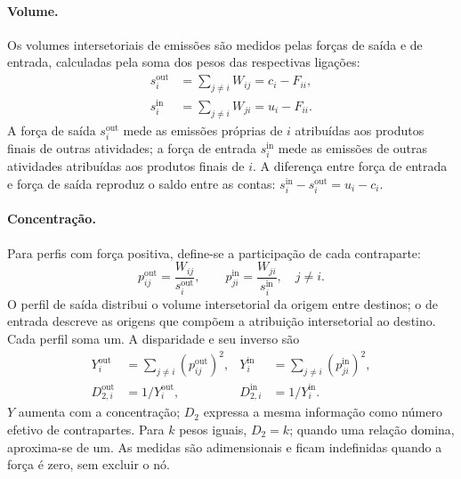 \paragraph{Volume.}
Os volumes intersetoriais de emissões são medidos pelas forças de saída e de entrada, calculadas pela soma dos pesos das respectivas ligações:
\begin{equation}
\begin{aligned}
s_i^{\mathrm{out}}&=\sum_{j\ne i}W_{ij}=c_i-F_{ii},\\
s_i^{\mathrm{in}}&=\sum_{j\ne i}W_{ji}=u_i-F_{ii}.
\end{aligned}
\label{eq:forcas-externas}
\end{equation}
A força de saída $s_i^{\mathrm{out}}$ mede as emissões próprias de $i$ atribuídas aos produtos finais de outras atividades; a força de entrada $s_i^{\mathrm{in}}$ mede as emissões de outras atividades atribuídas aos produtos finais de $i$. A diferença entre força de entrada e força de saída reproduz o saldo entre as contas: $s_i^{\mathrm{in}}-s_i^{\mathrm{out}}=u_i-c_i$.

\paragraph{Concentração.}
Para perfis com força positiva, define-se a participação de cada contraparte:
\begin{equation}
p_{ij}^{\mathrm{out}}=\frac{W_{ij}}{s_i^{\mathrm{out}}},\qquad
p_{ji}^{\mathrm{in}}=\frac{W_{ji}}{s_i^{\mathrm{in}}},\quad j\ne i.
\label{eq:participacoes-externas}
\end{equation}
O perfil de saída distribui o volume intersetorial da origem entre destinos; o de entrada descreve as origens que compõem a atribuição intersetorial ao destino. Cada perfil soma um. A disparidade e seu inverso são
\begin{equation}
\begin{aligned}
Y_i^{\mathrm{out}}&=\sum_{j\ne i}(p_{ij}^{\mathrm{out}})^2,&
Y_i^{\mathrm{in}}&=\sum_{j\ne i}(p_{ji}^{\mathrm{in}})^2,\\
D_{2,i}^{\mathrm{out}}&=1/Y_i^{\mathrm{out}},&
D_{2,i}^{\mathrm{in}}&=1/Y_i^{\mathrm{in}}.
\end{aligned}
\label{eq:disparidade}
\end{equation}
$Y$ aumenta com a concentração; $D_2$ expressa a mesma informação como número efetivo de contrapartes. Para $k$ pesos iguais, $D_2=k$; quando uma relação domina, aproxima-se de um. As medidas são adimensionais e ficam indefinidas quando a força é zero, sem excluir o nó.

